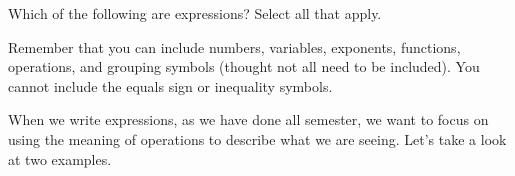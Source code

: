 \documentclass{ximera}
\begin{document}
\begin{question}
Which of the following are expressions? Select all that apply.
\begin{selectAll}
\end{selectAll}
\begin{hint}
Remember that you can include numbers, variables, exponents, functions, operations, and grouping symbols (thought not all need to be included). You cannot include the equals sign or inequality symbols.
\end{hint}
\end{question}

When we write expressions, as we have done all semester, we want to focus on using the meaning of operations to describe what we are seeing. Let's take a look at two examples.
\end{document}
